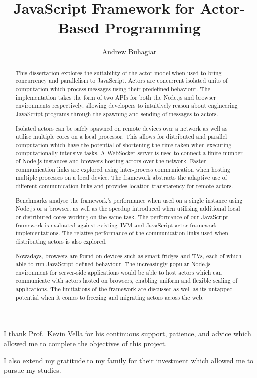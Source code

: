 \documentclass[oneside]{um-fict}
\title{JavaScript Framework for Actor-Based Programming}  %
\author{Andrew Buhagiar}            %
\begin{document}
\frontmatter 
    \maketitle
    \begin{acknowledgements}
    I thank Prof.\ Kevin Vella for his continuous support, patience, and advice which allowed me to complete the objectives of this project.
    
    I also extend my gratitude to my family for their investment which allowed me to pursue my studies.
    \end{acknowledgements}   %
    \begin{abstract}
    This dissertation explores the suitability of the actor model when used to bring concurrency and parallelism to JavaScript. Actors are concurrent isolated units of computation which process messages using their predefined behaviour. The implementation takes the form of two APIs for both the Node.js and browser environments respectively, allowing developers to intuitively reason about engineering JavaScript programs through the spawning and sending of messages to actors.
    
    Isolated actors can be safely spawned on remote devices over a network as well as utilise multiple cores on a local processor. This allows for distributed and parallel computation which have the potential of shortening the time taken when executing computationally intensive tasks. A WebSocket server is used to connect a finite number of Node.js instances and browsers hosting actors over the network. Faster communication links are explored using inter-process communication when hosting multiple processes on a local device. The framework abstracts the adaptive use of different communication links and provides location transparency for remote actors.
    
    Benchmarks analyse the framework's performance when used on a single instance using Node.js or a browser, as well as the speedup introduced when utilising additional local or distributed cores working on the same task. The performance of our JavaScript framework is evaluated against existing JVM and JavaScript actor framework implementations. The relative performance of the communication links used when distributing actors is also explored.
    
    Nowadays, browsers are found on devices such as smart fridges and TVs, each of which able to run JavaScript defined behaviour. The increasingly popular Node.js environment for server-side applications would be able to host actors which can communicate with actors hosted on browsers, enabling uniform and flexible scaling of applications. The limitations of the framework are discussed as well as its untapped potential when it comes to freezing and migrating actors across the web.
    \end{abstract}\if@openright\cleardoublepage\else\clearpage\fi
    \tableofcontents*\if@openright\cleardoublepage\else\clearpage\fi
    \listoffigures\if@openright\cleardoublepage\else\clearpage
\end{document}
